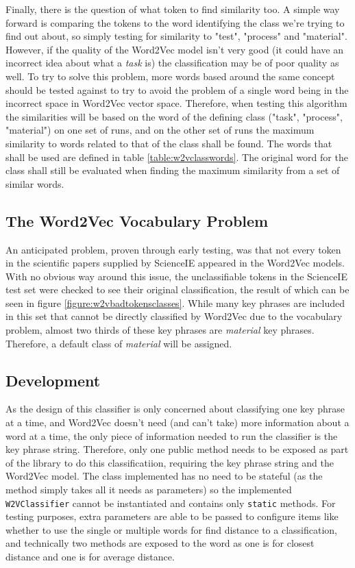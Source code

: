 Finally, there is the question of what token to find similarity too. A simple way forward is comparing the tokens to the word identifying the class we're trying to find out about, so simply testing for similarity to "test", "process" and "material". However, if the quality of the Word2Vec model isn't very good (it could have an incorrect idea about what a \textit{task} is) the classification may be of poor quality as well. To try to solve this problem, more words based around the same concept should be tested against to try to avoid the problem of a single word being in the incorrect space in Word2Vec vector space. Therefore, when testing this algorithm the similarities will be based on the word of the defining class ("task", "process", "material") on one set of runs, and on the other set of runs the maximum similarity to words related to that of the class shall be found. The words that shall be used are defined in table \ref{table:w2vclasswords}. The original word for the class shall still be evaluated when finding the maximum similarity from a set of similar words.

\subsection{The Word2Vec Vocabulary Problem}
An anticipated problem, proven through early testing, was that not every token in the scientific papers supplied by ScienceIE appeared in the Word2Vec models. With no obvious way around this issue, the unclassifiable tokens in the ScienceIE test set were checked to see their original classification, the result of which can be seen in figure \ref{figure:w2vbadtokensclasses}. While many key phrases are included in this set that cannot be directly classified by Word2Vec due to the vocabulary problem, almost two thirds of these key phrases are \textit{material} key phrases. Therefore, a default class of \textit{material} will be assigned.

\subsection{Development}
As the design of this classifier is only concerned about classifying one key phrase at a time, and Word2Vec doesn't need (and can't take) more information about a word at a time, the only piece of information needed to run the classifier is the key phrase string. Therefore, only one public method needs to be exposed as part of the library to do this classificatiion, requiring the key phrase string and the Word2Vec model. The class implemented has no need to be stateful (as the method simply takes all it needs as parameters) so the implemented \texttt{W2VClassifier} cannot be instantiated and contains only \texttt{static} methods. For testing purposes, extra parameters are able to be passed to configure items like whether to use the single or multiple words for find distance to a classification, and technically two methods are exposed to the word as one is for closest distance and one is for average distance.

